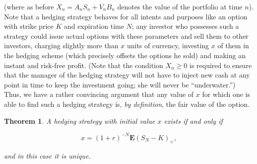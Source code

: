 \documentclass[11pt]{report}
\theoremstyle{plain}
\newtheorem{thm}{Theorem}[chapter]
\theoremstyle{definition}
\begin{document}
\noindent (where as before $X_n = A_n S_n + V_n B_n$ denotes
the value of the portfolio at time $n$). Note that a
hedging strategy behaves for all intents and purposes
like an option with strike price $K$ and expiration
time $N$; any investor who possesses such a strategy
could issue actual options with these parameters and
sell them to other investors, charging slightly more
than $x$ units of currency, investing $x$ of them in
the hedging scheme (which precisely offsets the
options he sold) and making an instant and risk-free
profit. (Note that the condition $X_n\ge0$ is
required to ensure that the manager of the hedging
strategy will not have to inject new cash at any point
in time to keep the investment going; she will never
be ``underwater.'') Thus, we have a rather convincing
argument that any value of $x$ for which one is able
to find such a hedging strategy is, \emph{by definition},
the fair value of the option.

\begin{thm}
A hedging strategy with initial value $x$ exists if
and only if

\begin{equation*} \tag{12}\label{eq:hedging-strategy-condition}
x=(1+r)^{-N}\mathbf{E}(S_N-K)_+,
\end{equation*}

\noindent and in this case it is unique.
\end{thm}
\end{document}
